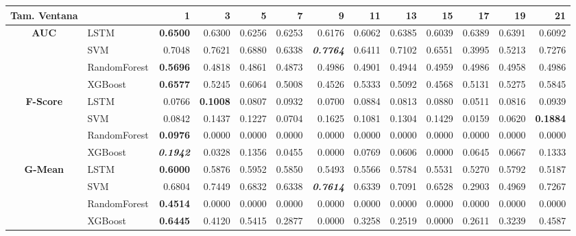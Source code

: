 \begin{table}[H]
	\centering
	\begin{adjustbox}{max width=14cm}
		\begin{tabular}{|c|l|r|r|r|r|r|r|r|r|r|r|r|}
			\hline
			\textbf{Tam. Ventana} &         &      1  &      3  &      5  &      7  &      9  &      11 &      13 &      15 &      17 &      19 &      21 \\
			\hline
			\textbf{AUC} &  LSTM & \textbf{  0.6500 } &  0.6300 &  0.6256 &  0.6253 &  0.6176 &  0.6062 &  0.6385 &  0.6039 &  0.6389 &  0.6391 &  0.6092 \\
			&  SVM &  0.7048 &  0.7621 &  0.6880 &  0.6338 & \textit{ \textbf{  0.7764 } } &  0.6411 &  0.7102 &  0.6551 &  0.3995 &  0.5213 &  0.7276 \\
			&  RandomForest & \textbf{  0.5696 } &  0.4818 &  0.4861 &  0.4873 &  0.4986 &  0.4901 &  0.4944 &  0.4959 &  0.4986 &  0.4958 &  0.4986 \\
			&  XGBoost & \textbf{  0.6577 } &  0.5245 &  0.6064 &  0.5008 &  0.4526 &  0.5333 &  0.5092 &  0.4568 &  0.5131 &  0.5275 &  0.5845 \\
			\hline
			\textbf{F-Score} &  LSTM &  0.0766 & \textbf{  0.1008 } &  0.0807 &  0.0932 &  0.0700 &  0.0884 &  0.0813 &  0.0880 &  0.0511 &  0.0816 &  0.0939 \\
			&  SVM &  0.0842 &  0.1437 &  0.1227 &  0.0704 &  0.1625 &  0.1081 &  0.1304 &  0.1429 &  0.0159 &  0.0620 & \textbf{  0.1884 } \\
			&  RandomForest & \textbf{  0.0976 } &  0.0000 &  0.0000 &  0.0000 &  0.0000 &  0.0000 &  0.0000 &  0.0000 &  0.0000 &  0.0000 &  0.0000 \\
			&  XGBoost & \textit{ \textbf{  0.1942 } } &  0.0328 &  0.1356 &  0.0455 &  0.0000 &  0.0769 &  0.0606 &  0.0000 &  0.0645 &  0.0667 &  0.1333 \\
			\hline
			\textbf{G-Mean} &  LSTM & \textbf{  0.6000 } &  0.5876 &  0.5952 &  0.5850 &  0.5493 &  0.5566 &  0.5784 &  0.5531 &  0.5270 &  0.5792 &  0.5187 \\
			&  SVM &  0.6804 &  0.7449 &  0.6832 &  0.6338 & \textit{ \textbf{  0.7614 } } &  0.6339 &  0.7091 &  0.6528 &  0.2903 &  0.4969 &  0.7267 \\
			&  RandomForest & \textbf{  0.4514 } &  0.0000 &  0.0000 &  0.0000 &  0.0000 &  0.0000 &  0.0000 &  0.0000 &  0.0000 &  0.0000 &  0.0000 \\
			&  XGBoost & \textbf{  0.6445 } &  0.4120 &  0.5415 &  0.2877 &  0.0000 &  0.3258 &  0.2519 &  0.0000 &  0.2611 &  0.3239 &  0.4587 \\

\end{tabular}
\end{adjustbox}
\end{table}
